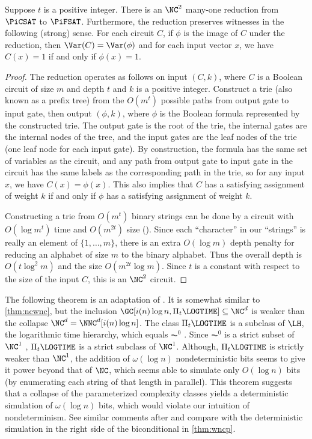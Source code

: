 \begin{lemma}\label{lem:circuittoformula}
  Suppose $t$ is a positive integer.
  There is an $\NC^2$ many-one reduction from $\PiCSAT$ to $\PiFSAT$.
  Furthermore, the reduction preserves witnesses in the following (strong) sense.
  For each circuit $C$, if $\phi$ is the image of $C$ under the reduction, then $\Var(C) = \Var(\phi)$ and for each input vector $x$, we have $C(x) = 1$ if and only if $\phi(x) = 1$.
\end{lemma}
\begin{proof}
  The reduction operates as follows on input $(C, k)$, where $C$ is a Boolean circuit of size $m$ and depth $t$ and $k$ is a positive integer.
  Construct a trie (also known as a prefix tree) from the $O(m^t)$ possible paths from output gate to input gate, then output $(\phi, k)$, where $\phi$ is the Boolean formula represented by the constructed trie.
  The output gate is the root of the trie, the internal gates are the internal nodes of the tree, and the input gates are the leaf nodes of the trie (one leaf node for each input gate).
  By construction, the formula has the same set of variables as the circuit, and any path from output gate to input gate in the circuit has the same labels as the corresponding path in the trie, so for any input $x$, we have $C(x) = \phi(x)$.
  This also implies that $C$ has a satisfying assignment of weight $k$ if and only if $\phi$ has a satisfying assignment of weight $k$.

  Constructing a trie from $O(m^t)$ binary strings can be done by a circuit with $O(\log m^t)$ time and $O(m^{2t})$ size \autocite{lv86} ().
  Since each ``character'' in our ``strings'' is really an element of $\{1, \dotsc, m\}$, there is an extra $O(\log m)$ depth penalty for reducing an alphabet of size $m$ to the binary alphabet.
  Thus the overall depth is $O(t \log^2 m)$ and the size $O(m^{2t} \log m)$.
  Since $t$ is a constant with respect to the size of the input $C$, this is an $\NC^2$ circuit.
\end{proof}

The following theorem is an adaptation of \autocite[Theorem~4.3]{cc97npo}.
It is somewhat similar to \autoref{thm:ncwnc}, but the inclusion $\GC[i(n) \log n, \Pi_t \LOGTIME] \subseteq \NC^d$ is weaker than the collapse $\NC^d = \NNC^d[i(n) \log n]$.
The class $\Pi_t \LOGTIME$ is a subclass of $\LH$, the logarithmic time hierarchy, which equals $\AC^0$ \autocite[Corollary~5.32]{immerman99}.
Since $\AC^0$ is a strict subset of $\NC^1$ \autocite{fss84}, $\Pi_t \LOGTIME$ is a strict subclass of $\NC^1$.
Although, $\Pi_t \LOGTIME$ is strictly weaker than $\NC^1$, the addition of $\omega(\log n)$ nondeterministic bits seems to give it power beyond that of $\NC$, which seems able to simulate only $O(\log n)$ bits (by enumerating each string of that length in parallel).
This theorem suggests that a collapse of the parameterized complexity classes yields a deterministic simulation of $\omega(\log n)$ bits, which would violate our intuition of nondeterminism.
See similar comments after \autocite[Theorem~4.3]{cc97npo} and compare with the deterministic simulation in the right side of the biconditional in \autoref{thm:wncp}.

